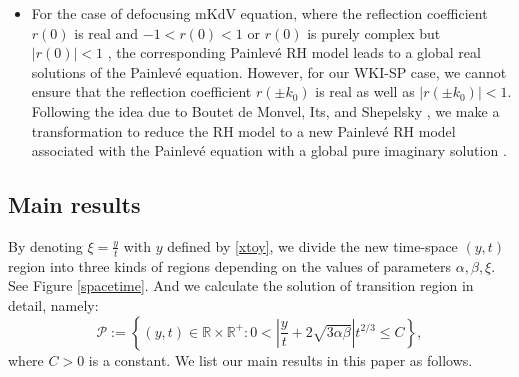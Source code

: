 \documentclass[11pt]{article}
\numberwithin{equation}{section}
\begin{document}
\begin{itemize}
 \item  For  the case of  defocusing mKdV equation, where the reflection coefficient $ r(0) $  is real and $-1<r(0)<1$   \cite{zhou-1993} or $ r(0) $  is purely complex  but  $|r(0)|<1$ \cite{Charlier}, the corresponding  Painlev\'e RH model leads  to    a  global real solutions of  the Painlev\'{e} \uppercase\expandafter{}  equation.  However, for our  WKI-SP case,   we cannot ensure that  the reflection coefficient $r(\pm k_0)$ is   real as well as   $|r(\pm k_0)|<1$.   Following the idea due to Boutet de Monvel, Its, and Shepelsky   \cite{Monvel}, we make   a   transformation to reduce the RH model to      a new Painlev\'e RH model    associated with  the Painlev\'{e} \uppercase\expandafter{} equation  with  a  global pure imaginary  solution \cite{DZ2}.

\end{itemize}

\subsection{Main results}



By denoting $\xi=\frac{y}{t}$ with $y$ defined by \eqref{xtoy}, we divide the new time-space $(y,t)$ region into three kinds of regions depending on the values of parameters $\alpha,\beta,\xi$. See Figure \ref{spacetime}.  And we calculate the solution of transition region in detail, namely:
 $$  {\mathcal{P}:=\left\{ (y,t) \in \mathbb{R}\times\mathbb{R}^+: 0<\left|\frac{y}{t}+2\sqrt{3\alpha\beta}\right|t^{2/3}\leqslant C\right\}, }  $$
where $C>0$ is a constant.
We list our main results in this paper as follows.
\end{document}
